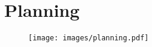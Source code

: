 \newpage

\section{Planning}

\begin{figure}[!h]
	\centering
	\texttt{[image: images/planning.pdf]} 
	\label{Planning}
\end{figure}
